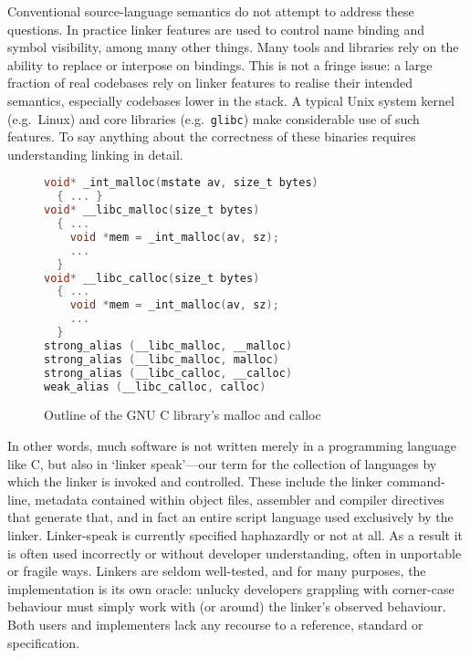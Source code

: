 \documentclass[preprint,10pt]{sigplanconf-pldi16}
\begin{document}
%
%
Conventional source-language semantics do not attempt to address these
questions. 
In practice
linker features are used to control name binding and symbol
visibility, among many other things. 
Many tools and libraries rely on the ability to replace or interpose on bindings.
This is not a fringe issue: a large fraction of real codebases rely on
linker features to realise their intended semantics, especially codebases lower in the stack. 
A typical Unix system kernel (e.g.~Linux) and core libraries (e.g.~\texttt{glibc}) make considerable use of such features.
To say anything about the correctness of these binaries requires
understanding linking in detail. 

\begin{figure}[t]
\begin{lstlisting}[language=C,basicstyle=\footnotesize\sffamily,columns=flexible]
void* _int_malloc(mstate av, size_t bytes)
  { ... }
void* __libc_malloc(size_t bytes)
  { ...
    void *mem = _int_malloc(av, sz);
    ...
  }
void* __libc_calloc(size_t bytes)
  { ...
    void *mem = _int_malloc(av, sz);
    ...
  }
strong_alias (__libc_malloc, __malloc) 
strong_alias (__libc_malloc, malloc)
strong_alias (__libc_calloc, __calloc) 
weak_alias (__libc_calloc, calloc)
\end{lstlisting}
\caption{Outline of the GNU C library's \textsf{malloc} and \textsf{calloc}}
\label{fig:glibc-malloc}
\end{figure}

In other words, much software is not written merely in a programming
language like C, 
but also in `linker speak'---our term for the collection of languages by which the linker is invoked and controlled.
These include the linker command-line, metadata contained within object files, assembler and compiler directives that generate that, and in fact an entire script language used exclusively by the linker.
%
Linker-speak is currently specified haphazardly or not at all.
As a result it is often used incorrectly or without developer understanding, often in unportable or fragile ways.
Linkers are seldom well-tested, and for many purposes, the implementation is its own oracle: unlucky developers grappling with corner-case behaviour must simply work with (or around) the linker's observed behaviour.
Both users and implementers lack any recourse to a reference, standard or specification. 
\end{document}
